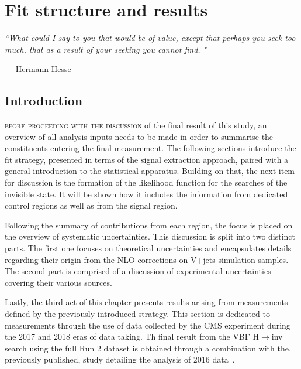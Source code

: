 \chapter{Fit structure and results}
\label{ch:fit}
\epigraph{\itshape``What could I say to you that would be of value, except that perhaps you seek too much, that as a result of your seeking you cannot find. "}{--- \textup{Hermann Hesse}}

\section{Introduction}
\hspace{10pt} \hspace{10pt}\lettrine[lines=2]{}{efore proceeding with the discussion} of the final result of this study, an overview of all analysis inputs needs to be made in order to summarise the constituents entering the final measurement. The following sections introduce the fit strategy, presented in terms of the signal extraction approach, paired with a general introduction to the statistical apparatus. Building on that, the next item for discussion is the formation of the likelihood function for the searches of the invisible state. It will be shown how it includes the information from dedicated control regions as well as from the signal region.

\hspace{10pt} Following the summary of contributions from each region, the focus is placed on the overview of systematic uncertainties. This discussion is split into two distinct parts. The first one focuses on theoretical uncertainties and encapsulates details regarding their origin from the NLO corrections on V+jets simulation samples. The second part is comprised of a discussion of experimental uncertainties covering their various sources.


\hspace{10pt} Lastly, the third act of this chapter presents results arising from measurements defined by the previously introduced strategy. This section is dedicated to measurements through the use of data collected by the CMS experiment during the 2017 and 2018 eras of data taking. Th final result from the VBF H$\rightarrow$inv search using the full Run 2 dataset is obtained through a combination with the, previously published, study detailing the analysis of 2016 data~\cite{paper:HIG_17_023}.

